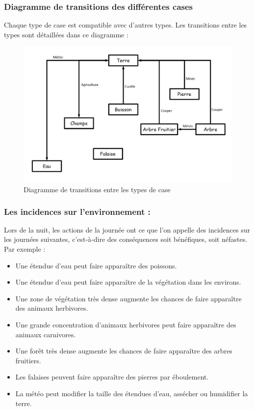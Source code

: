 \documentclass[a4paper]{memoir}
\begin{document}
				\subsubsection{Diagramme de transitions des différentes cases}
					Chaque type de case est compatible avec d'autres types. Les transitions entre les types sont détaillées dans ce diagramme :
					\begin{figure}[H]
						\begin{center}
							\includegraphics[scale=0.35]{img/DiagrammeTransitionCases.png} 
						\end{center}
						\label{fig:case}
						\caption{Diagramme de transitions entre les types de case}
					\end{figure}
			
				\subsubsection{Les incidences sur l'environnement :}
					Lors de la nuit, les actions de la journée ont ce que l'on appelle des incidences sur les journées suivantes, c'est-à-dire des conséquences soit bénéfiques, soit néfastes. Par exemple :
					\begin{itemize}[label=$\bullet$]
						\item Une étendue d'eau peut faire apparaître des poissons.
						\item Une étendue d'eau peut faire apparaître de la végétation dans les environs.
						\item Une zone de végétation très dense augmente les chances de faire apparaître des animaux herbivores.
						\item Une grande concentration d'animaux herbivores peut faire apparaître des animaux carnivores.
						\item Une forêt très dense augmente les chances de faire apparaître des arbres fruitiers.
						\item Les falaises peuvent faire apparaître des pierres par éboulement.
						\item La météo peut modifier la taille des étendues d'eau, assécher ou humidifier la terre.
					\end{itemize}
				
\end{document}
